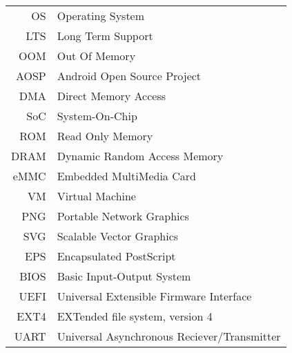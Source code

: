 


\begin{center}
\label{abbrv}
\begin{tabular}{r l}
	OS & Operating System \\
	LTS & Long Term Support \\
	OOM & Out Of Memory \\
	AOSP & Android Open Source Project \\ 
	DMA & Direct Memory Access \\ 
	SoC & System-On-Chip \\
	ROM & Read Only Memory \\
	DRAM & Dynamic Random Access Memory \\
	eMMC & Embedded MultiMedia Card \\
	VM & Virtual Machine \\
	PNG & Portable Network Graphics \\
	SVG & Scalable Vector Graphics \\
	EPS & Encapsulated PostScript \\
	BIOS & Basic Input-Output System \\
	UEFI & Universal Extensible Firmware Interface \\
	EXT4 & EXTended file system, version 4 \\
	UART & Universal Asynchronous Reciever/Transmitter
\end{tabular}
\end{center}


\newpage

